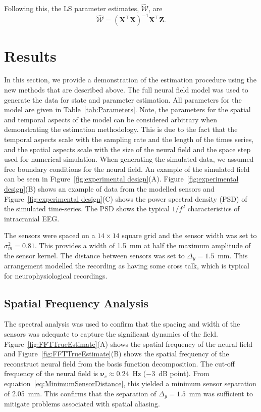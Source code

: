 \documentclass[10pt]{article}
\begin{document}
Following this, the LS parameter estimates, $ \mathcal{\hat{W}}$, are
\begin{equation}
	\mathcal{\hat{W}}=(\mathbf X^\top\mathbf X)^{-1}\mathbf X^\top\mathbf Z. 
\end{equation}

\section*{Results}\label{ResultsSection} In this section, we provide a demonstration of the estimation procedure using the new methods that are described above. The full neural field model was used to generate the data for state and parameter estimation. All parameters for the model are given in Table~\ref{tab:Parameters}. Note, the parameters for the spatial and temporal aspects of the model can be considered arbitrary when demonstrating the estimation methodology. This is due to the fact that the temporal aspects scale with the sampling rate and the length of the times series, and the spatial aspects scale with the size of the neural field and the space step used for numerical simulation. When generating the simulated data, we assumed free boundary conditions for the neural field. An example of the simulated field can be seen in Figure~\ref{fig:experimental design}(A). Figure~\ref{fig:experimental design}(B) shows an example of data from the modelled sensors and Figure~\ref{fig:experimental design}(C) shows the power spectral density (PSD) of the simulated time-series. The PSD shows the typical $1/f^2$ characteristics of intracranial EEG.

The sensors were spaced on a $14 \times 14$ square grid and the sensor width was set to $\sigma^2_m = 0.81$. This provides a width of 1.5~mm at half the maximum amplitude of the sensor kernel. The distance between sensors was set to $\Delta_y = 1.5$~mm. This arrangement modelled the recording as having some cross talk, which is typical for neurophysiological recordings.

\subsection*{Spatial Frequency Analysis} 
The spectral analysis was used to confirm that the spacing and width of the sensors was adequate to capture the significant dynamics of the field. Figure~\ref{fig:FFTTrueEstimate}(A) shows the spatial frequency of the neural field and Figure~\ref{fig:FFTTrueEstimate}(B) shows the spatial frequency of the reconstruct neural field from the basis function decomposition. The cut-off frequency of the neural field is $\boldsymbol{\nu}_c \approx 0.24$~Hz ($-3$~dB point). From equation~\ref{eq:MinimumSensorDistance}, this yielded a minimum sensor separation of 2.05~mm. This confirms that the separation of $\Delta_{y} = 1.5$~mm was sufficient to mitigate problems associated with spatial aliasing.
\end{document}
